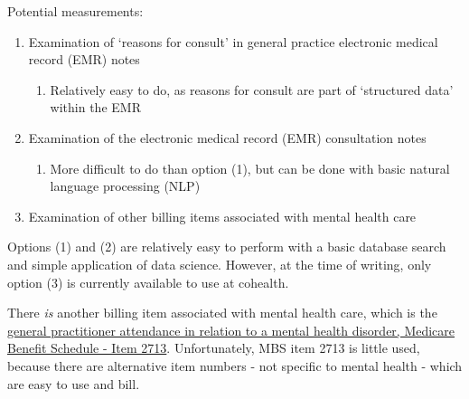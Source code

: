 \documentclass[
  letterpaper,
  DIV=11,
  numbers=noendperiod,
  oneside]{scrartcl}
\providecommand{\tightlist}{%
  \setlength{\itemsep}{0pt}\setlength{\parskip}{0pt}}\usepackage{longtable,booktabs,array}
\begin{document}
Potential measurements:

\begin{enumerate}
\def\labelenumi{\arabic{enumi}.}
\tightlist
\item
  Examination of `reasons for consult' in general practice electronic
  medical record (EMR) notes

  \begin{enumerate}
  \def\labelenumii{\roman{enumii})}
  \tightlist
  \item
    Relatively easy to do, as reasons for consult are part of
    `structured data' within the EMR
  \end{enumerate}
\item
  Examination of the electronic medical record (EMR) consultation notes

  \begin{enumerate}
  \def\labelenumii{\roman{enumii})}
  \tightlist
  \item
    More difficult to do than option (1), but can be done with basic
    natural language processing (NLP)
  \end{enumerate}
\item
  Examination of other billing items associated with mental health care
\end{enumerate}

Options (1) and (2) are relatively easy to perform with a basic database
search and simple application of data science. However, at the time of
writing, only option (3) is currently available to use at cohealth.

There \emph{is} another billing item associated with mental health care,
which is the
\href{https://www9.health.gov.au/mbs/fullDisplay.cfm?type=item&q=2713}{general
practitioner attendance in relation to a mental health disorder,
Medicare Benefit Schedule - Item 2713}. Unfortunately, MBS item 2713 is
little used, because there are alternative item numbers - not specific
to mental health - which are easy to use and bill.
\end{document}
